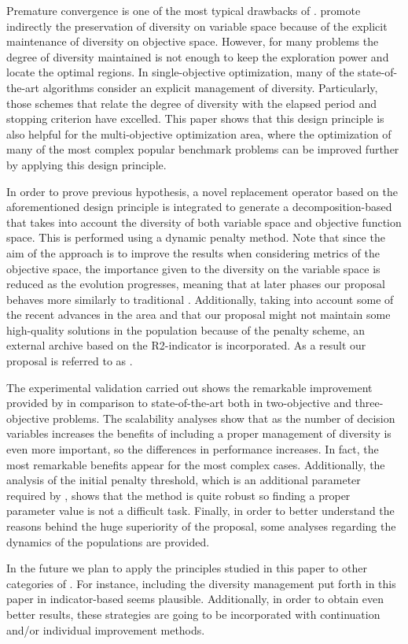Premature convergence is one of the most typical drawbacks of \EAS{}.
%
\MOEAS{} promote indirectly the preservation of diversity on variable space
because of the explicit maintenance of diversity on objective space.
%
However, for many problems the degree of diversity maintained is not enough to keep the exploration
power and locate the optimal regions.
%
In single-objective optimization, many of the state-of-the-art algorithms consider an explicit management of
diversity.
%
Particularly, those schemes that relate the degree of diversity with the elapsed period and stopping criterion
have excelled.
%
This paper shows that this design principle is also helpful for the multi-objective optimization area,
where the optimization of many of the most complex popular benchmark problems can be improved further
by applying this design principle.

In order to prove previous hypothesis, a novel replacement operator based on the aforementioned design principle
is integrated to generate a decomposition-based \MOEA{} that takes into account the diversity of both variable 
space and objective function space.
%
This is performed using a dynamic penalty method. 
%
Note that since the aim of the approach is to improve the results when considering metrics of the objective space,
the importance given to the diversity on the variable space is reduced as the evolution progresses, meaning that
at later phases our proposal behaves more similarly to traditional \MOEAS{}.
%
Additionally, taking into account some of the recent advances in the area and that our proposal might not maintain
some high-quality solutions in the population because of the penalty scheme, an external archive based on the
R2-indicator is incorporated.
%
As a result our proposal is referred to as \AVSDMOEAD{}.
%

The experimental validation carried out shows the remarkable improvement provided by \AVSDMOEAD{} in comparison to
state-of-the-art \MOEAS{} both in two-objective and three-objective problems.
%
The scalability analyses show that as the number of decision variables increases the benefits of including
a proper management of diversity is even more important, so the differences in performance increases.
%
In fact, the most remarkable benefits appear for the most complex cases.
%
Additionally, the analysis of the initial penalty threshold, which is an additional parameter required by \AVSDMOEAD{}, 
shows that the method is quite robust so finding a proper parameter value is not a difficult task.
%
Finally, in order to better understand the reasons behind the huge superiority of the proposal, some analyses regarding
the dynamics of the populations are provided.

In the future we plan to apply the principles studied in this paper to other categories of \MOEAS{}.
%
For instance, including the diversity management put forth in this paper in indicator-based \MOEAS{} seems plausible.
%
Additionally, in order to obtain even better results, these strategies are going to be incorporated with continuation and/or individual
improvement methods.
